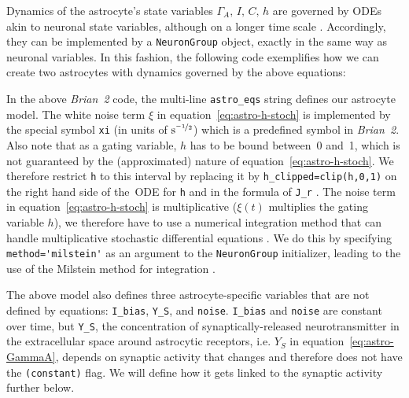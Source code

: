 \documentclass[a4paper, 11pt]{article}
\newcommand{\brian}{\emph{Brian~2}\xspace}
\newcommand*{\appref}[1]{Appendix~\ref{#1}}
\renewcommand*{\eqref}[1]{equation~\ref{#1}}
\begin{document}
Dynamics of the astrocyte's state variables $\Gamma_A,\,I,\,C,\,h$ are governed by ODEs akin to neuronal state variables, although on a longer time scale \citep{DePitta_CognProc2009}.
Accordingly, they can be implemented by a \lstinline|NeuronGroup| object, exactly in the same way as neuronal variables.
In this fashion, the following code exemplifies how we can create two astrocytes with dynamics governed by the above equations:

In the above \brian code, the multi-line \lstinline|astro_eqs| string defines our astrocyte model. The white noise term $\xi$ in \eqref{eq:astro-h-stoch} is implemented by the special symbol \lstinline|xi| (in units of $\si{\second}^{\nicefrac{-1}{2}}$) which is a predefined symbol in \brian.
Also note that as a gating variable, $h$ has to be bound between~0 and~1, which is not guaranteed by the (approximated) nature of \eqref{eq:astro-h-stoch}.
We therefore restrict \lstinline|h| to this interval by replacing it by \lstinline|h_clipped=clip(h,0,1)| on the right hand side of the~ODE for \lstinline|h| and in the formula of \lstinline|J_r| \citep{Shuai_BJ2002}.
The noise term in \eqref{eq:astro-h-stoch} is multiplicative ($\xi(t)$ multiplies the gating variable $h$), we therefore have to use a numerical integration method that can handle multiplicative stochastic differential equations \citep[under the Stratonovich interpretation, cf.][]{KloedenPlaten1992}.
We do this by specifying \lstinline|method='milstein'| as an argument to the \lstinline|NeuronGroup| initializer, leading to the use of the Milstein method for integration \citep[also see details on \texttt{example\_2\_gchi\_astrocyte.py} in \appref{apx:example-files}]{Milstein1975,KloedenPlaten1992}.

The above model also defines three astrocyte-specific variables that are not defined by equations: \lstinline|I_bias|, \lstinline|Y_S|, and \lstinline|noise|.
\lstinline|I_bias| and \lstinline|noise| are constant over time, but \lstinline|Y_S|, the concentration of synaptically-released neurotransmitter in the extracellular space around astrocytic receptors, i.e. $Y_S$ in \eqref{eq:astro-GammaA}, depends on synaptic activity that changes and therefore does not have the \lstinline|(constant)| flag.
We will define how it gets linked to the synaptic activity further below.
\end{document}
